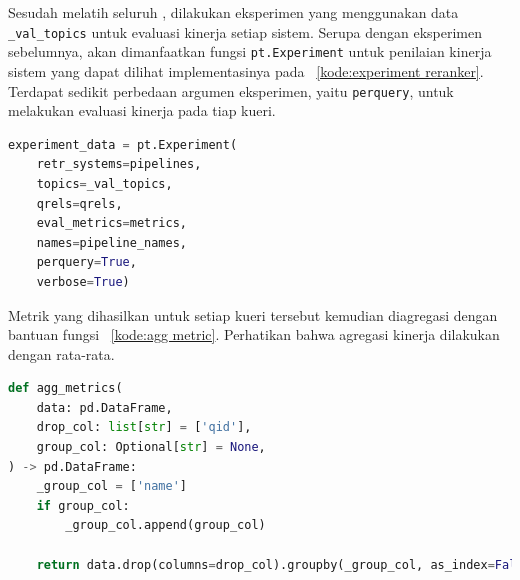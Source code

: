 Sesudah melatih seluruh \reranker{}, dilakukan eksperimen yang menggunakan data \lstinline{_val_topics} untuk evaluasi kinerja setiap sistem. Serupa dengan eksperimen sebelumnya, akan dimanfaatkan fungsi \lstinline{pt.Experiment} untuk penilaian kinerja sistem yang dapat dilihat implementasinya pada \kode{}~\ref{kode:experiment reranker}. Terdapat sedikit perbedaan argumen eksperimen, yaitu \lstinline{perquery}, untuk melakukan evaluasi kinerja pada tiap kueri.
\begin{lstlisting}[language=Python, caption={Eksperimen \retrieval{}}, label={kode:experiment reranker}]
experiment_data = pt.Experiment(
    retr_systems=pipelines,
    topics=_val_topics,
    qrels=qrels,
    eval_metrics=metrics,
    names=pipeline_names,
    perquery=True,
    verbose=True)
\end{lstlisting}

Metrik yang dihasilkan untuk setiap kueri tersebut kemudian diagregasi dengan bantuan fungsi \kode{}~\ref{kode:agg metric}. Perhatikan bahwa agregasi kinerja dilakukan dengan rata-rata.
\begin{lstlisting}[language=Python, caption={Agregasi metrik hasil eksperimen}, label={kode:agg metric}]
def agg_metrics(
    data: pd.DataFrame,
    drop_col: list[str] = ['qid'],
    group_col: Optional[str] = None,
) -> pd.DataFrame:
    _group_col = ['name']
    if group_col:
        _group_col.append(group_col)

    return data.drop(columns=drop_col).groupby(_group_col, as_index=False).mean()
\end{lstlisting}
